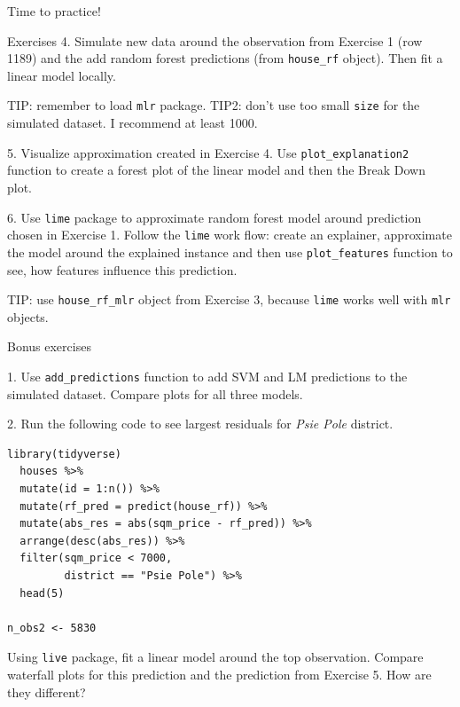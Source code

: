 \documentclass[xcolor={dvipsnames}]{beamer}
\begin{document}
\begin{frame}{Time to practice!}
  
\end{frame}


\begin{frame}[fragile]{Exercises}
4. Simulate new data around the observation from Exercise 1 (row 1189) and the add random forest predictions (from \texttt{house\_rf} object). Then fit a linear model locally.
	
TIP: remember to load \texttt{mlr} package.
TIP2: don't use too small \texttt{size} for the simulated dataset. I recommend at least 1000.
	
5. Visualize approximation created in Exercise 4.
Use \texttt{plot\_explanation2} function to create a forest plot of the linear model and then the Break Down plot. 

6. Use \texttt{lime} package to approximate random forest model around prediction chosen in  Exercise 1.
Follow the \texttt{lime} work flow: create an explainer, approximate the model around the explained instance and then use \texttt{plot\_features} function to see, how features influence this prediction.

TIP: use \texttt{house\_rf\_mlr} object from Exercise 3, because \texttt{lime} works well with \texttt{mlr} objects.

\end{frame}

\begin{frame}[fragile]{Bonus exercises}

1. Use \texttt{add\_predictions} function to add SVM and LM predictions to the simulated dataset. Compare plots for all three models.
	
2. Run the following code to see largest residuals for \textit{Psie Pole} district.
\begin{lstlisting}
library(tidyverse)
  houses %>%
  mutate(id = 1:n()) %>%
  mutate(rf_pred = predict(house_rf)) %>%
  mutate(abs_res = abs(sqm_price - rf_pred)) %>%
  arrange(desc(abs_res)) %>%
  filter(sqm_price < 7000,
         district == "Psie Pole") %>%
  head(5)

n_obs2 <- 5830
\end{lstlisting}
Using \texttt{live} package, fit a linear model around the top observation.
Compare waterfall plots for this prediction and the prediction from Exercise 5.
How are they different?

\end{frame}

%		
%		
	
\end{document}
